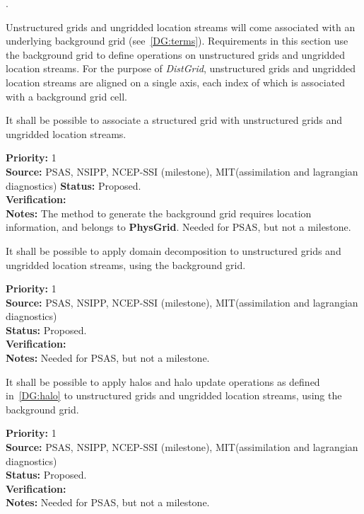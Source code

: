  \label{DG:Unstructured}.

Unstructured grids and ungridded location streams will come associated
with an underlying background grid (see~\ref{DG:terms}). Requirements
in this section use the background grid to define operations on
unstructured grids and ungridded location streams. For the purpose of
\emph{DistGrid}, unstructured grids and ungridded location streams are
aligned on a single axis, each index of which is associated with a
background grid cell.


It shall be possible to associate a structured grid with unstructured
grids and ungridded location streams.

\begin{reqlist}
{\bf Priority:} 1 \\ 
{\bf Source:} PSAS, NSIPP, NCEP-SSI (milestone), MIT(assimilation  and lagrangian diagnostics)
{\bf Status:} Proposed. \\
{\bf Verification:} \\
{\bf Notes:} The method to generate the background grid requires
  location information, and belongs to \textbf{PhysGrid}.  Needed
  for PSAS, but not a milestone.
\end{reqlist}


It shall be possible to apply domain decomposition to unstructured
grids and ungridded location streams, using the background grid.

\begin{reqlist}
{\bf Priority:} 1 \\ 
{\bf Source:} PSAS, NSIPP, NCEP-SSI (milestone), MIT(assimilation  and lagrangian diagnostics) \\
{\bf Status:} Proposed. \\ 
{\bf Verification:} \\
{\bf Notes:}  Needed for PSAS, but not a milestone.
\end{reqlist}


It shall be possible to apply halos and halo update operations as
defined in~\ref{DG:halo} to unstructured grids and ungridded location
streams, using the background grid.

\begin{reqlist}
{\bf Priority:} 1 \\ 
{\bf Source:} PSAS, NSIPP, NCEP-SSI (milestone), MIT(assimilation and lagrangian diagnostics) \\
{\bf Status:} Proposed. \\
{\bf Verification:} \\
{\bf Notes:} Needed for PSAS, but not a milestone.
\end{reqlist}

